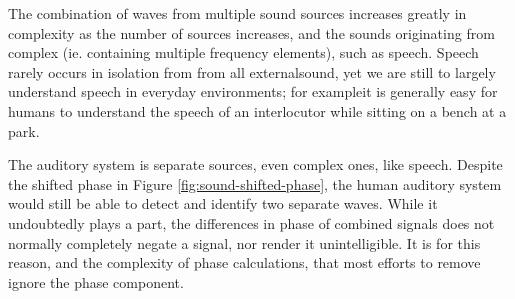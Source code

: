 \DIFdelend The combination of waves from multiple sound sources increases greatly in complexity as the number of sources increases, and the \DIFaddbegin {}\DIFaddend sounds originating from \DIFdelbegin {}\DIFdelend \DIFaddbegin {}\DIFaddend complex (ie. containing multiple frequency elements), such as speech.  Speech rarely occurs in isolation from from all external\DIFaddbegin {}\DIFaddend sound, yet we are still \DIFaddbegin {}\DIFaddend to largely understand speech in everyday environments; for example\DIFaddbegin \DIFadd{, }\DIFaddend it is generally easy for humans to understand the speech of an interlocutor while sitting on a bench at a park.

The auditory system is \DIFdelbegin {}\DIFdelend \DIFaddbegin {}\DIFaddend separate sources, even complex ones, like speech. Despite the shifted phase in Figure \ref{fig:sound-shifted-phase}, the human auditory system would still be able to detect and identify two separate waves.  While it undoubtedly plays a part, the differences in phase of combined signals does not normally completely negate a signal, nor render it unintelligible.  It is for this reason, and the complexity of phase calculations, that most efforts to remove \DIFdelbegin {}\DIFdelend \DIFaddbegin {}\DIFaddend ignore the phase component.

